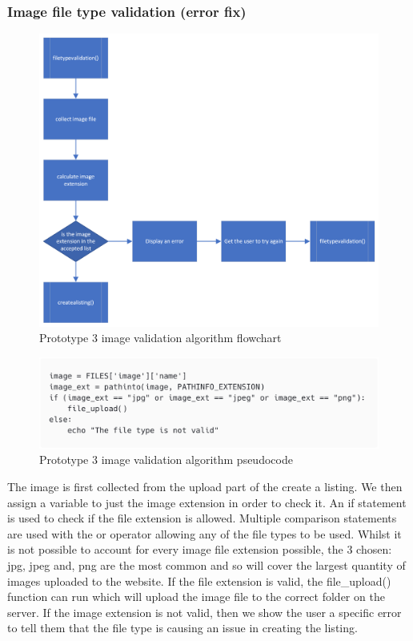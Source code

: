 \subsubsection{Image file type validation (error fix)}
\begin{figure}[H]
    \centering
    \includegraphics[scale=0.4]{ch3_developing/proto3/flow_imagefile.png}
    \caption{Prototype 3 image validation algorithm flowchart}
    \label{fig:proto3_flowimagefile}
\end{figure}
 \begin{figure}[H]
     \centering
     \includegraphics[scale=0.3]{ch3_developing/proto3/image_filetype.png}
     \caption{Prototype 3 image validation algorithm pseudocode}
     \label{fig:proto3_filetypealg}
 \end{figure}
The image is first collected from the upload part of the create a listing. We then assign a variable to just the image extension in order to check it. An if statement is used to check if the file extension is allowed. Multiple comparison statements are used with the or operator allowing any of the file types to be used. Whilst it is not possible to account for every image file extension possible, the 3 chosen: jpg, jpeg and, png are the most common and so will cover the largest quantity of images uploaded to the website. If the file extension is valid, the file\_upload() function can run which will upload the image file to the correct folder on the server. If the image extension is not valid, then we show the user a specific error to tell them that the file type is causing an issue in creating the listing.  

